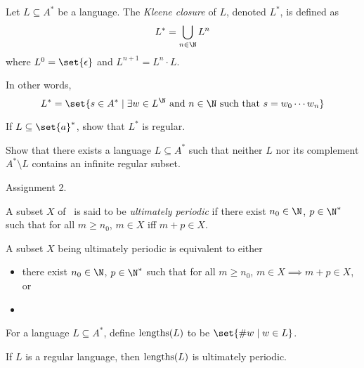 
\begin{definition}
    Let $L \subseteq A^*$ be a language.
    The \emph{Kleene closure} of $L$, denoted $L^*$, is defined as \[
        L^* = \bigcup_{n \in \N} L^n
    \] where $L^0 = \set{\epsilon}$ and $L^{n+1} = L^n \cdot L$.
\end{definition}
In other words, \[
    L^* = \set{s \in A^* \mid \exists w \in L^\N \text{ and }
        n \in \N \text{ such that } s = w_0 \cdots w_n}
\]
\begin{exercise}
    If $L \subseteq \set{a}^*$, show that $L^*$ is regular.
\end{exercise}
\begin{exercise}
    Show that there exists a language $L \subseteq A^*$ such that neither
    $L$ nor its complement $A^* \setminus L$ contains an infinite regular
    subset.
\end{exercise}
\begin{solution}
    Assignment 2.
\end{solution}

\begin{definition} \label{def:ultimate_periodicity}
    A subset $X$ of \N\ is said to be \emph{ultimately periodic} if there
    exist $n_0 \in \N$, $p \in \N^*$ such that for all $m \ge n_0$,
    $m \in X$ iff $m + p \in X$.
\end{definition}
\begin{proposition}
    A subset $X$ being ultimately periodic is equivalent to either
    \begin{itemize}
        \item there exist $n_0 \in \N$, $p \in \N^*$ such that for all
            $m \ge n_0$, $m \in X \implies m + p \in X$, or
        \item 
    \end{itemize}
\end{proposition}

\begin{definition}
    For a language $L \subseteq A^*$, define $\operatorname{lengths}(L)$ to be
    $\set{\size w \mid w \in L}$.
\end{definition}
\begin{theorem*}
    If $L$ is a regular language, then $\operatorname{lengths}(L)$ is ultimately periodic.
\end{theorem*}

